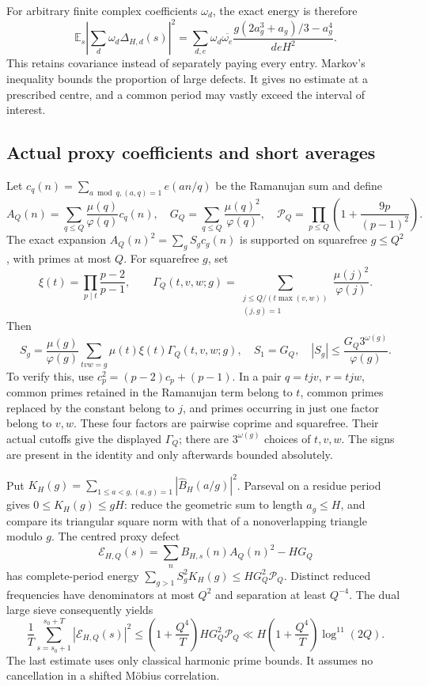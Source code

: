 \documentclass[11pt,a4paper]{article}
\theoremstyle{definition}
\theoremstyle{remark}
\begin{document}
For arbitrary finite complex coefficients $\omega_d$, the exact energy is therefore
\[\mathbb E_s\left|\sum_d\omega_d\Delta_{H,d}(s)\right|^2
 =\sum_{d,e}\omega_d\overline{\omega_e}
 \frac{g(2a_g^3+a_g)/3-a_g^4}{deH^2}.\]
This retains covariance instead of separately paying every entry. Markov's inequality bounds the proportion of large defects. It gives no estimate at a prescribed centre, and a common period may vastly exceed the interval of interest.

\subsection{Actual proxy coefficients and short averages}
Let $c_q(n)=\sum_{a\bmod q,(a,q)=1}e(an/q)$ be the Ramanujan sum and define
\[ A_Q(n)=\sum_{q\le Q}\frac{\mu(q)}{\varphi(q)}c_q(n),\quad
 G_Q=\sum_{q\le Q}\frac{\mu(q)^2}{\varphi(q)},\quad
 \mathcal P_Q=\prod_{p\le Q}\left(1+\frac{9p}{(p-1)^2}\right).\]
The exact expansion $A_Q(n)^2=\sum_g S_gc_g(n)$ is supported on squarefree $g\le Q^2$, with primes at most $Q$. For squarefree $g$, set
\[\xi(t)=\prod_{p\mid t}\frac{p-2}{p-1},\qquad
 \Gamma_Q(t,v,w;g)=\sum_{\substack{j\le Q/(t\max(v,w))\\(j,g)=1}}
 \frac{\mu(j)^2}{\varphi(j)}.\]
Then
\begin{equation}\label{eq:proxy-coefficients}
 S_g=\frac{\mu(g)}{\varphi(g)}\sum_{tvw=g}\mu(t)\xi(t)\Gamma_Q(t,v,w;g),
 \quad S_1=G_Q,\quad |S_g|\le\frac{G_Q3^{\omega(g)}}{\varphi(g)}.
\end{equation}
To verify this, use $c_p^2=(p-2)c_p+(p-1)$. In a pair $q=tjv$, $r=tjw$, common primes retained in the Ramanujan term belong to $t$, common primes replaced by the constant belong to $j$, and primes occurring in just one factor belong to $v,w$. These four factors are pairwise coprime and squarefree. Their actual cutoffs give the displayed $\Gamma_Q$; there are $3^{\omega(g)}$ choices of $t,v,w$. The signs are present in the identity and only afterwards bounded absolutely.

Put $K_H(g)=\sum_{1\le a<g,(a,g)=1}|\widehat B_H(a/g)|^2$. Parseval on a residue period gives $0\le K_H(g)\le gH$: reduce the geometric sum to length $a_g\le H$, and compare its triangular square norm with that of a nonoverlapping triangle modulo $g$. The centred proxy defect
\[\mathcal E_{H,Q}(s)=\sum_nB_{H,s}(n)A_Q(n)^2-HG_Q\]
has complete-period energy $\sum_{g>1}S_g^2K_H(g)\le HG_Q^2\mathcal P_Q$.
Distinct reduced frequencies have denominators at most $Q^2$ and separation at least $Q^{-4}$. The dual large sieve \cite{MV} consequently yields
\begin{equation}\label{eq:proxy-short}
 \frac1T\sum_{s=s_0+1}^{s_0+T}|\mathcal E_{H,Q}(s)|^2
 \le\left(1+\frac{Q^4}{T}\right)HG_Q^2\mathcal P_Q
 \ll H\left(1+\frac{Q^4}{T}\right)\log^{11}(2Q).
\end{equation}
The last estimate uses only classical harmonic prime bounds. It assumes no cancellation in a shifted M\"obius correlation.
\end{document}
